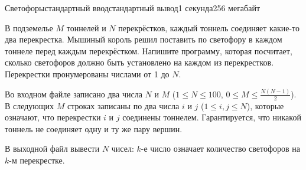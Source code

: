 \begin{problem}{Светофоры}{стандартный ввод}{стандартный вывод}{1 секунда}{256 мегабайт}

В подземелье $M$ тоннелей и $N$ перекрёстков, каждый тоннель соединяет какие-то два перекрестка. Мышиный король решил поставить по светофору в каждом тоннеле перед каждым перекрёстком. Напишите программу, которая посчитает, сколько светофоров должно быть установлено на каждом из перекрестков. Перекрестки пронумерованы числами от 1 до $N$.

\InputFile
Во входном файле записано два числа $N$ и $M$ ($1 \le N \le 100$, $0 \le M \le \frac{N(N - 1)}{2}$). В следующих $M$ строках записаны по два числа $i$ и $j$ ($1 \le i, j \le N$), которые означают, что перекрестки $i$ и $j$ соединены тоннелем. Гарантируется, что никакой тоннель не соединяет одну и ту же пару вершин.

\OutputFile
В выходной файл вывести $N$ чисел: $k$-е число означает количество светофоров на $k$-м перекрестке.

\Example

\begin{example}
%
\end{example}

\end{problem}

